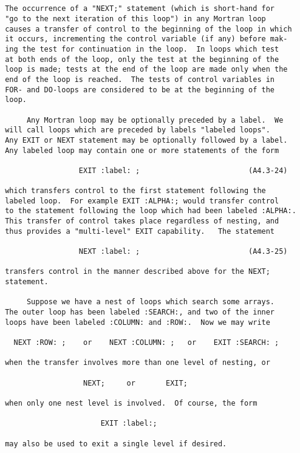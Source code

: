 \newpage \begin{verbatim}


 The occurrence of a "NEXT;" statement (which is short-hand for
 "go to the next iteration of this loop") in any Mortran loop
 causes a transfer of control to the beginning of the loop in which
 it occurs, incrementing the control variable (if any) before mak-
 ing the test for continuation in the loop.  In loops which test
 at both ends of the loop, only the test at the beginning of the
 loop is made; tests at the end of the loop are made only when the
 end of the loop is reached.  The tests of control variables in
 FOR- and DO-loops are considered to be at the beginning of the
 loop.

      Any Mortran loop may be optionally preceded by a label.  We
 will call loops which are preceded by labels "labeled loops".
 Any EXIT or NEXT statement may be optionally followed by a label.
 Any labeled loop may contain one or more statements of the form

                  EXIT :label: ;                         (A4.3-24)

 which transfers control to the first statement following the
 labeled loop.  For example EXIT :ALPHA:; would transfer control
 to the statement following the loop which had been labeled :ALPHA:.
 This transfer of control takes place regardless of nesting, and
 thus provides a "multi-level" EXIT capability.   The statement

                  NEXT :label: ;                         (A4.3-25)

 transfers control in the manner described above for the NEXT;
 statement.

      Suppose we have a nest of loops which search some arrays.
 The outer loop has been labeled :SEARCH:, and two of the inner
 loops have been labeled :COLUMN: and :ROW:.  Now we may write

   NEXT :ROW: ;    or    NEXT :COLUMN: ;   or    EXIT :SEARCH: ;

 when the transfer involves more than one level of nesting, or

                   NEXT;     or       EXIT;

 when only one nest level is involved.  Of course, the form

                       EXIT :label:;

 may also be used to exit a single level if desired.
\end{verbatim}
